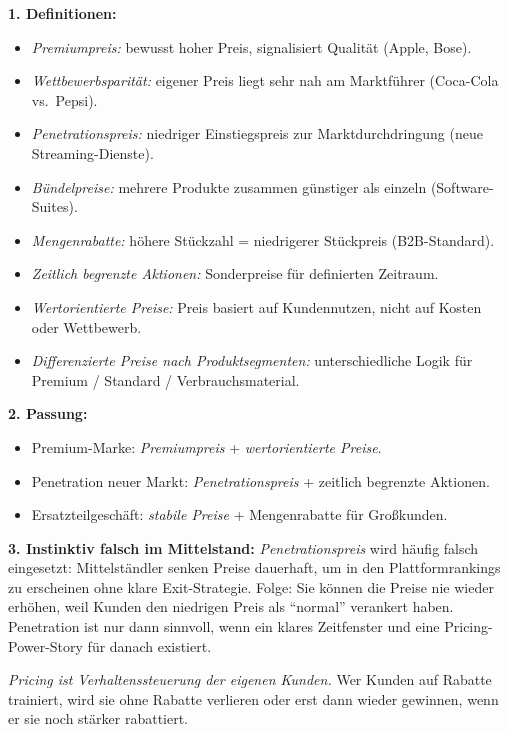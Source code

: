 \documentclass[11pt,a4paper,oneside]{article}
\begin{document}
\begin{loesungbox}
\textbf{1. Definitionen:}
\begin{itemize}
  \item \emph{Premiumpreis:} bewusst hoher Preis, signalisiert Qualität (Apple, Bose).
  \item \emph{Wettbewerbsparität:} eigener Preis liegt sehr nah am Marktführer (Coca-Cola vs.\ Pepsi).
  \item \emph{Penetrationspreis:} niedriger Einstiegspreis zur Marktdurchdringung (neue Streaming-Dienste).
  \item \emph{Bündelpreise:} mehrere Produkte zusammen günstiger als einzeln (Software-Suites).
  \item \emph{Mengenrabatte:} höhere Stückzahl = niedrigerer Stückpreis (B2B-Standard).
  \item \emph{Zeitlich begrenzte Aktionen:} Sonderpreise für definierten Zeitraum.
  \item \emph{Wertorientierte Preise:} Preis basiert auf Kundennutzen, nicht auf Kosten oder Wettbewerb.
  \item \emph{Differenzierte Preise nach Produktsegmenten:} unterschiedliche Logik für Premium / Standard / Verbrauchsmaterial.
\end{itemize}

\textbf{2. Passung:}
\begin{itemize}
  \item Premium-Marke: \emph{Premiumpreis} + \emph{wertorientierte Preise}.
  \item Penetration neuer Markt: \emph{Penetrationspreis} + zeitlich begrenzte Aktionen.
  \item Ersatzteilgeschäft: \emph{stabile Preise} + Mengenrabatte für Großkunden.
\end{itemize}

\textbf{3. Instinktiv falsch im Mittelstand:}
\emph{Penetrationspreis} wird häufig falsch eingesetzt: Mittelständler senken Preise dauerhaft, um in den Plattformrankings zu erscheinen \textendash{} ohne klare Exit-Strategie. Folge: Sie können die Preise nie wieder erhöhen, weil Kunden den niedrigen Preis als ``normal'' verankert haben. Penetration ist nur dann sinnvoll, wenn ein klares Zeitfenster und eine Pricing-Power-Story für danach existiert.

\begin{merkbox}[Managementhinweis]
\emph{Pricing ist Verhaltenssteuerung der eigenen Kunden.} Wer Kunden auf Rabatte trainiert, wird sie ohne Rabatte verlieren \textendash{} oder erst dann wieder gewinnen, wenn er sie noch stärker rabattiert.
\end{merkbox}
\end{loesungbox}
\end{document}
